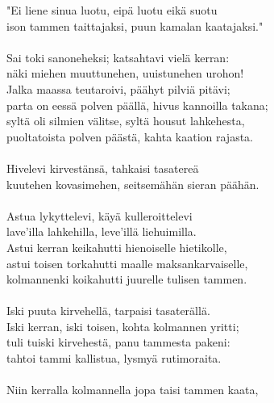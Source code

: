 "Ei liene sinua luotu, eipä luotu eikä suotu                    \\
ison tammen taittajaksi, puun kamalan kaatajaksi."              \\
                                                                \\
Sai toki sanoneheksi; katsahtavi vielä kerran:                  \\
näki miehen muuttunehen, uuistunehen urohon!                    \\
Jalka maassa teutaroivi, päähyt pilviä pitävi;                  \\
parta on eessä polven päällä, hivus kannoilla takana;           \\
syltä oli silmien välitse, syltä housut lahkehesta,             \\
puoltatoista polven päästä, kahta kaation rajasta.              \\
                                                                \\
Hivelevi kirvestänsä, tahkaisi tasatereä                        \\
kuutehen kovasimehen, seitsemähän sieran päähän.                \\
                                                                \\
Astua lykyttelevi, käyä kulleroittelevi                         \\
lave'illa lahkehilla, leve'illä liehuimilla.                    \\
Astui kerran keikahutti hienoiselle hietikolle,                 \\
astui toisen torkahutti maalle maksankarvaiselle,               \\
kolmannenki koikahutti juurelle tulisen tammen.                 \\
                                                                \\
Iski puuta kirvehellä, tarpaisi tasaterällä.                    \\
Iski kerran, iski toisen, kohta kolmannen yritti;               \\
tuli tuiski kirvehestä, panu tammesta pakeni:                   \\
tahtoi tammi kallistua, lysmyä rutimoraita.                     \\
                                                                \\
Niin kerralla kolmannella jopa taisi tammen kaata,              \\
